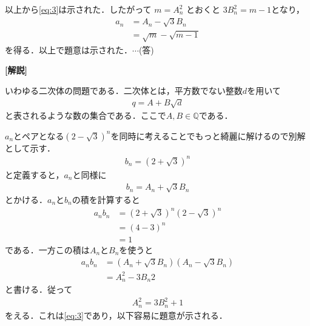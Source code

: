 \documentclass[a4paper,10pt]{ltjsarticle}
\begin{document}
\begin{multicols}{2}
以上から\cref{eq:3}は示された．したがって
$m=A_n^2$ とおくと $3B_n^2 = m-1$となり，
\begin{align*}
  a_n 
  &= A_n - \sqrt{3} B_n \\
  &= \sqrt{m} - \sqrt{m-1}
\end{align*}
を得る．以上で題意は示された．$\cdots$(答)

\vspace{10pt}
{\bf[解説]}

いわゆる二次体の問題である．二次体とは，平方数でない整数$d$を用いて
\begin{align*}
  q = A + B\sqrt{d}
\end{align*}
と表されるような数の集合である．ここで$A,B \in \mathbb{Q}$である．

$a_n$とペアとなる$(2-\sqrt{3})^n$を同時に考えることでもっと綺麗に解けるので別解として示す．
\begin{align*}
  b_n = (2+\sqrt{3})^n
\end{align*}
と定義すると，$a_n$と同様に
\begin{align*}
  b_n = A_n + \sqrt{3} B_n
\end{align*}
とかける．$a_n$と$b_n$の積を計算すると
\begin{align*}
  a_nb_n 
  &= (2+\sqrt{3})^n(2-\sqrt{3})^n \\
  &= \left(4-3\right)^n \\
  &= 1
\end{align*}
である．一方この積は$A_n$と$B_n$を使うと
\begin{align*}
  a_nb_n 
  &= (A_n+\sqrt{3}B_n)(A_n-\sqrt{3}B_n) \\
  &= A_n^2 -3B_n2 
\end{align*}
と書ける．従って
\begin{align*}
  A_n^2 = 3B_n^2 +1
\end{align*}
をえる．これは\cref{eq:3}であり，以下容易に題意が示される．

\newpage
\end{multicols}
\end{document}
